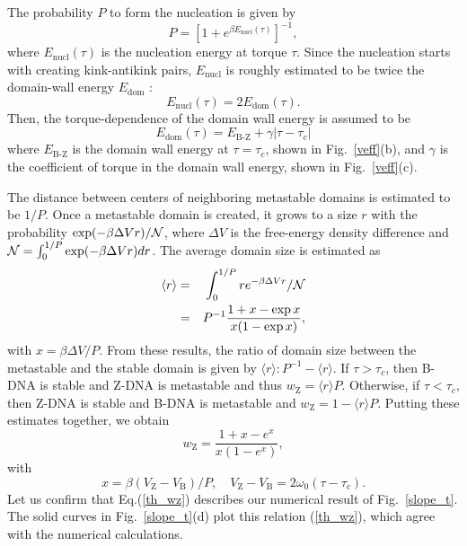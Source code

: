\documentclass[pre,showpacs,twocolumn,superscriptaddress]{revtex4}
\begin{document}
The probability $P$ to form the nucleation is
given by
\begin{equation}
P=[1+e^{\beta E_{\text{nucl}}(\tau)}]^{-1},
\end{equation}
where 
$E_\text{nucl}(\tau)$ is the nucleation energy at torque $\tau$.
Since the nucleation starts with creating kink-antikink pairs,
$E_\text{nucl}$ is roughly estimated to be
twice the domain-wall energy  $E_\text{dom}$ \cite{kinknote}:
\begin{equation}E_{\text{nucl}}(\tau)=2 E_\text{dom}(\tau).
\label{Enucl}
\end{equation}
Then,
the torque-dependence of the domain wall energy is assumed
to be
\begin{equation}
E_{\text{dom}}(\tau)= E_{\text{B-Z}}+\gamma |\tau-\tau_c|
\label{p_eq}
\end{equation}
where 
$E_{\text{B-Z}}$ is the domain wall energy at $\tau=\tau_c$, shown in
Fig.~\ref{veff}(b),
and 
$\gamma$ is the coefficient of torque in the domain wall energy,
shown in 
Fig.~\ref{veff}(c).


The distance between centers of neighboring metastable domains
is estimated to be $1/P$.
Once a metastable domain is created, 
it grows to a size $r$ 
with the probability 
$\exp(-\beta \Delta V r)/{\cal N}$,
where
$\Delta V$ is the free-energy density difference
and
${\cal N}=\int_0^{1/P} \exp(-\beta \Delta V r) dr$.
The average domain size is estimated as 
\begin{eqnarray*}
\langle r \rangle 
&=&
\int_0^{1/P}
r e^{-\beta \Delta V r}/\cal{N} \\
&=&P^{-1}
\frac{1+x-\exp x}{x(1-\exp x)},
\end{eqnarray*}
with 
$x=\beta \Delta V/P$.
From these results,
the ratio of domain size between 
the metastable and the stable domain
is given by
$\langle r \rangle : P^{-1}-\langle r \rangle$.
If $\tau >\tau_c$,
then B-DNA is stable and Z-DNA is metastable
and thus
$
w_\text{Z}=
\langle r \rangle P
$.
Otherwise,
if $\tau <\tau_c$,
then Z-DNA is stable and B-DNA is metastable
and
$
w_\text{Z}=
1-\langle r \rangle P
$.
Putting these estimates together,
we obtain
\begin{equation}
w_\text{Z}=
\frac{1+x-e^x}{x(1-e^x)},
\label{th_wz}
\end{equation}
with 
\begin{equation}
x=\beta(V_\text{Z}-V_\text{B})/P,\quad
V_\text{Z}-V_\text{B}=2 \omega_0 (\tau-\tau_c).
\end{equation}
Let us confirm that Eq.(\ref{th_wz}) describes our numerical result of 
Fig.~\ref{slope_t}.
The solid curves in Fig.~\ref{slope_t}(d) plot this relation
(\ref{th_wz}),
which agree with the numerical calculations.  
\end{document}
